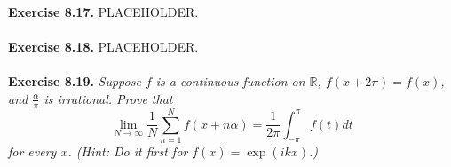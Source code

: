 \documentclass{article}
\begin{document}



\textbf{Exercise 8.17.}
PLACEHOLDER. \\\\






\textbf{Exercise 8.18.}
PLACEHOLDER. \\\\






\textbf{Exercise 8.19.}
\emph{Suppose $f$ is a continuous function on $\mathbb{R}$,
$f(x+2\pi) = f(x)$, and $\frac{\alpha}{\pi}$ is irrational.
Prove that
\[
  \lim_{N \to \infty} \frac{1}{N} \sum_{n=1}^{N} f(x+n\alpha)
  = \frac{1}{2\pi} \int_{-\pi}^{\pi} f(t) dt
\]
for every $x$.
(Hint: Do it first for $f(x) = \exp(ikx)$.)}\\
\end{document}
